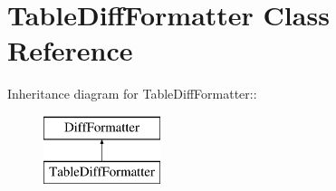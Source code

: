 \hypertarget{classTableDiffFormatter}{
\section{TableDiffFormatter Class Reference}
\label{classTableDiffFormatter}
}
Inheritance diagram for TableDiffFormatter::\begin{figure}[H]
\begin{center}
\leavevmode
\includegraphics[height=2cm]{classTableDiffFormatter}
\end{center}
\end{figure}
